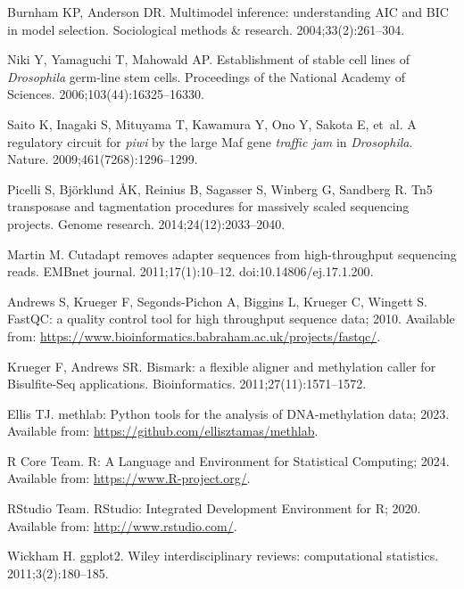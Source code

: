 \documentclass[10pt,letterpaper,draft]{article}
\begin{document}
\begin{thebibliography}{10}
Burnham KP, Anderson DR.
\newblock Multimodel inference: understanding AIC and BIC in model selection.
\newblock Sociological methods \& research. 2004;33(2):261--304.

Niki Y, Yamaguchi T, Mahowald AP.
\newblock Establishment of stable cell lines of \emph{Drosophila} germ-line stem cells.
\newblock Proceedings of the National Academy of Sciences. 2006;103(44):16325--16330.

Saito K, Inagaki S, Mituyama T, Kawamura Y, Ono Y, Sakota E, et~al.
\newblock A regulatory circuit for \textit{piwi} by the large Maf gene \textit{traffic jam} in \textit{Drosophila}.
\newblock Nature. 2009;461(7268):1296--1299.

Picelli S, Bj{\"o}rklund {\AA}K, Reinius B, Sagasser S, Winberg G, Sandberg R.
\newblock Tn5 transposase and tagmentation procedures for massively scaled sequencing projects.
\newblock Genome research. 2014;24(12):2033--2040.

Martin M.
\newblock Cutadapt removes adapter sequences from high-throughput sequencing reads.
\newblock EMBnet journal. 2011;17(1):10--12.
\newblock doi:{10.14806/ej.17.1.200}.

Andrews S, Krueger F, Segonds-Pichon A, Biggins L, Krueger C, Wingett S. FastQC: a quality control tool for high throughput sequence data; 2010.
\newblock Available from: \url{https://www.bioinformatics.babraham.ac.uk/projects/fastqc/}.

Krueger F, Andrews SR.
\newblock Bismark: a flexible aligner and methylation caller for Bisulfite-Seq applications.
\newblock Bioinformatics. 2011;27(11):1571--1572.

Ellis TJ. methlab: Python tools for the analysis of DNA-methylation data; 2023.
\newblock Available from: \url{https://github.com/ellisztamas/methlab}.

{R Core Team}. R: A Language and Environment for Statistical Computing; 2024.
\newblock Available from: \url{https://www.R-project.org/}.

{RStudio Team}. RStudio: Integrated Development Environment for R; 2020.
\newblock Available from: \url{http://www.rstudio.com/}.

Wickham H.
\newblock ggplot2.
\newblock Wiley interdisciplinary reviews: computational statistics. 2011;3(2):180--185.


\end{thebibliography}
\end{document}
